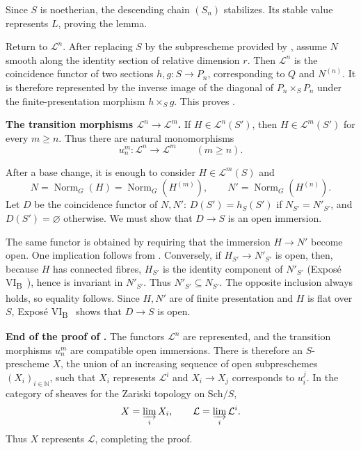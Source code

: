 Since \(S\) is noetherian, the descending chain \((S_n)\) stabilizes.
Its stable value represents \(L\), proving the lemma.

Return to \(\mathcal L^n\). After replacing \(S\) by the subprescheme
provided by , assume \(N\) smooth along the identity section
of relative dimension \(r\). Then \(\mathcal L^n\) is the coincidence
functor of two sections \(h,g:S\to P_n\), corresponding to \(Q\) and
\(N^{(n)}\). It is therefore represented by the inverse image of the
diagonal of \(P_n\times_SP_n\) under the finite-presentation morphism
\(h\times_Sg\). This proves .

\medskip\noindent
\textbf{The transition morphisms
\(\mathcal L^n\to\mathcal L^m\).}
If \(H\in\mathcal L^n(S')\), then \(H\in\mathcal L^m(S')\) for every
\(m\geq n\). Thus there are natural monomorphisms
\[
  u_n^m:\mathcal L^n\longrightarrow\mathcal L^m
  \qquad(m\geq n).
\]


After a base change, it is enough to consider \(H\in\mathcal L^m(S)\)
and
\[
 N=\operatorname{Norm}_G(H)=\operatorname{Norm}_G(H^{(m)}),
 \qquad
 N'=\operatorname{Norm}_G(H^{(n)}).
\]
Let \(D\) be the coincidence functor of \(N,N'\): \(D(S')=h_S(S')\)
if \(N_{S'}=N'_{S'}\), and \(D(S')=\varnothing\) otherwise. We must
show that \(D\to S\) is an open immersion.

The same functor is obtained by requiring that the immersion
\(H\to N'\) become open. One implication follows from
. Conversely, if \(H_{S'}\to N'_{S'}\) is open, then,
because \(H\) has connected fibres, \(H_{S'}\) is the identity
component of \(N'_{S'}\) (Exposé VI\textsubscript{B}~), hence is
invariant in \(N'_{S'}\). Thus \(N'_{S'}\subseteq N_{S'}\). The
opposite inclusion always holds, so equality follows. Since \(H,N'\)
are of finite presentation and \(H\) is flat over \(S\), Exposé
VI\textsubscript{B}~ shows that \(D\to S\) is open.

\medskip\noindent\textbf{End of the proof of .}
The functors \(\mathcal L^n\) are represented, and the transition
morphisms \(u_n^m\) are compatible open immersions. There is therefore
an \(S\)-prescheme \(X\), the union of an increasing sequence of open
subpreschemes \((X_i)_{i\in\mathbb N}\), such that \(X_i\) represents
\(\mathcal L^i\) and \(X_i\to X_j\) corresponds to \(u_i^j\). In the
category of sheaves for the Zariski topology on \(\mathrm{Sch}/S\),
\[
  X=\varinjlim_iX_i,\qquad
  \mathcal L=\varinjlim_i\mathcal L^i.
\]
Thus \(X\) represents \(\mathcal L\), completing the proof.

